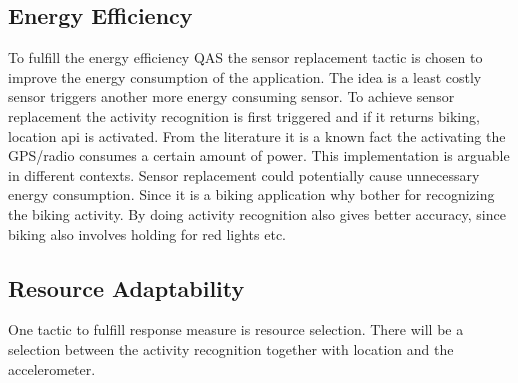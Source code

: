 \subsection{Energy Efficiency}
To fulfill the energy efficiency QAS the sensor replacement tactic is chosen to improve the energy consumption of the application. The idea is a least costly sensor triggers another more energy consuming sensor. To achieve sensor replacement the activity recognition is first triggered and if it returns biking, location api is activated. From the literature \cite{Kjaergaard2010} it is a known fact the activating the GPS/radio consumes a certain amount of power. This implementation is arguable in different contexts. Sensor replacement could potentially cause unnecessary energy consumption. Since it is a biking application why bother for recognizing the biking activity. By doing activity recognition also gives better accuracy, since biking also involves holding for red lights etc. 


\subsection{Resource Adaptability}
One tactic to fulfill response measure is resource selection. There will be a selection between the activity recognition together with location and the accelerometer. 

 